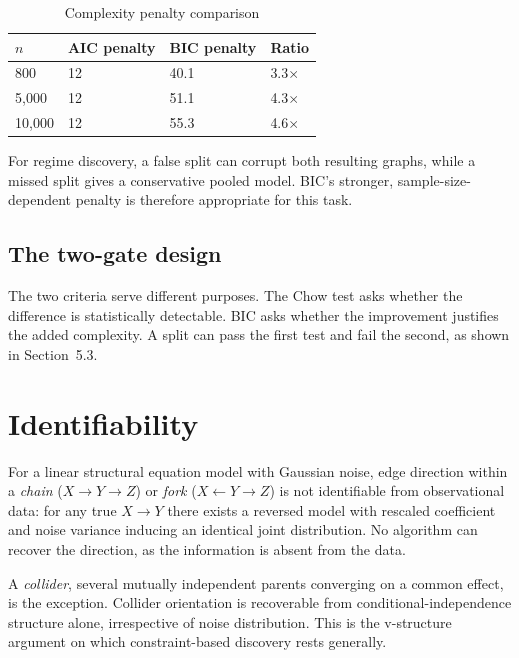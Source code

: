\begin{table}[htbp]
    \centering
    \small
    \caption{Complexity penalty comparison}
    \label{tab:ch4-bic}
    \begin{tabularx}{\textwidth}{|X|X|X|X|}
        \hline
        $n$ & AIC penalty & BIC penalty & Ratio \\ \hline
        800 & 12 & 40.1 & 3.3$\times$ \\ \hline
        5,000 & 12 & 51.1 & 4.3$\times$ \\ \hline
        10,000 & 12 & 55.3 & 4.6$\times$ \\ \hline
\end{tabularx}
\end{table}

For regime discovery, a false split can corrupt both resulting graphs, while a missed
split gives a conservative pooled model. BIC's stronger, sample-size-dependent
penalty is therefore appropriate for this task.


\subsection{The two-gate design}

The two criteria serve different purposes. The Chow test asks whether the difference
is statistically detectable. BIC asks whether the improvement justifies the added
complexity. A split can pass the first test and fail the second, as shown in Section~5.3.


\section{Identifiability}

For a linear structural equation model with Gaussian noise, edge direction within a
\textit{chain} ($X \to Y \to Z$) or \textit{fork} ($X \leftarrow Y \to Z$) is not identifiable from
observational data: for any true $X \to Y$ there exists a reversed model with rescaled
coefficient and noise variance inducing an identical joint distribution. No algorithm
can recover the direction, as the information is absent from the data.

A \textit{collider}, several mutually independent parents converging on a common effect, is
the exception. Collider orientation is recoverable from conditional-independence
structure alone, irrespective of noise distribution. This is the v-structure argument
on which constraint-based discovery rests generally.

